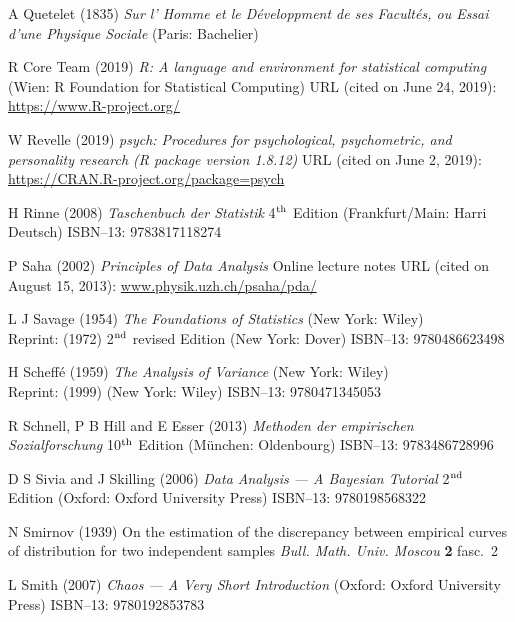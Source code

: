 \begin{thebibliography}{99}
A Quetelet
(1835) \textit{Sur l' Homme et le D\'{e}veloppment de ses 
Facult\'{e}s, ou Essai d'une Physique Sociale} (Paris: Bachelier)

R Core Team
(2019) \textit{R: A language and environment for statistical
computing} (Wien: R Foundation for Statistical Computing)
URL (cited on June 24, 2019): \href{https://www.R-project.org/}{https://www.R-project.org/}

W Revelle
(2019) \textit{psych: Procedures for psychological, psychometric,
and personality research (R package version 1.8.12)}
URL (cited on June 2, 2019): 
\href{https://CRAN.R-project.org/package=psych}{https://CRAN.R-project.org/package=psych}

H Rinne
(2008) \textit{Taschenbuch der Statistik}
4$^{\rm th}$ Edition (Frankfurt/Main: Harri Deutsch)
ISBN--13: 9783817118274

P Saha
(2002) \textit{Principles of Data Analysis} Online lecture notes
URL (cited on August 15, 2013):
\href{http://www.physik.uzh.ch/~psaha/pda/pda-a4.pdf}{www.physik.uzh.ch/\texttildelow psaha/pda/}

L J Savage
(1954) \textit{The Foundations of Statistics} (New York: Wiley)\\
Reprint: (1972) 2$^{\rm nd}$ revised Edition (New York: Dover) 
ISBN--13: 9780486623498

H Scheff\'{e}
(1959) \textit{The Analysis of Variance}
(New York: Wiley)\\
Reprint: (1999) (New York: Wiley) ISBN--13: 9780471345053

R Schnell, P B Hill and E Esser
(2013) \textit{Methoden der empirischen Sozialforschung} 10$^{\rm 
th}$ Edition (M\"{u}nchen: Oldenbourg) ISBN--13: 9783486728996

D S Sivia and J Skilling
(2006) \textit{Data Analysis --- A Bayesian Tutorial}
2$^{\rm nd}$ Edition (Oxford: Oxford University Press)
ISBN--13: 9780198568322

N Smirnov
(1939) On the estimation of the discrepancy between empirical 
curves of distribution for two independent samples
\textit{Bull. Math. Univ. Moscou} \textbf{2} fasc.~2

L Smith
(2007) \textit{Chaos --- A Very Short Introduction}
(Oxford: Oxford University Press)
ISBN--13: 9780192853783


\end{thebibliography}
